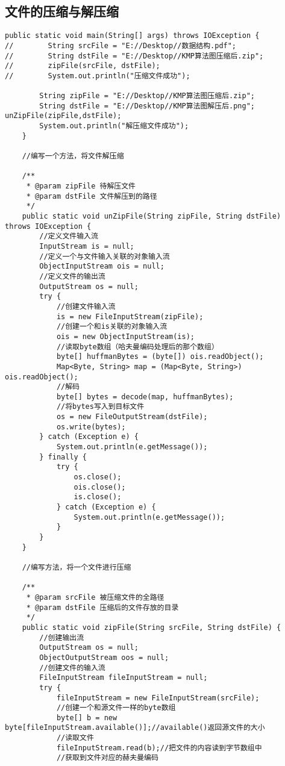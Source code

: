 \documentclass[a4paper]{report}
\begin{document}
\subsection{文件的压缩与解压缩}
\begin{lstlisting}
public static void main(String[] args) throws IOException {
//        String srcFile = "E://Desktop//数据结构.pdf";
//        String dstFile = "E://Desktop//KMP算法图压缩后.zip";
//        zipFile(srcFile, dstFile);
//        System.out.println("压缩文件成功");

        String zipFile = "E://Desktop//KMP算法图压缩后.zip";
        String dstFile = "E://Desktop//KMP算法图解压后.png";
unZipFile(zipFile,dstFile);
        System.out.println("解压缩文件成功");
    }

    //编写一个方法，将文件解压缩

    /**
     * @param zipFile 待解压文件
     * @param dstFile 文件解压到的路径
     */
    public static void unZipFile(String zipFile, String dstFile) throws IOException {
        //定义文件输入流
        InputStream is = null;
        //定义一个与文件输入关联的对象输入流
        ObjectInputStream ois = null;
        //定义文件的输出流
        OutputStream os = null;
        try {
            //创建文件输入流
            is = new FileInputStream(zipFile);
            //创建一个和is关联的对象输入流
            ois = new ObjectInputStream(is);
            //读取byte数组（哈夫曼编码处理后的那个数组）
            byte[] huffmanBytes = (byte[]) ois.readObject();
            Map<Byte, String> map = (Map<Byte, String>) ois.readObject();
            //解码
            byte[] bytes = decode(map, huffmanBytes);
            //将bytes写入到目标文件
            os = new FileOutputStream(dstFile);
            os.write(bytes);
        } catch (Exception e) {
            System.out.println(e.getMessage());
        } finally {
            try {
                os.close();
                ois.close();
                is.close();
            } catch (Exception e) {
                System.out.println(e.getMessage());
            }
        }
    }

    //编写方法，将一个文件进行压缩

    /**
     * @param srcFile 被压缩文件的全路径
     * @param dstFile 压缩后的文件存放的目录
     */
    public static void zipFile(String srcFile, String dstFile) {
        //创建输出流
        OutputStream os = null;
        ObjectOutputStream oos = null;
        //创建文件的输入流
        FileInputStream fileInputStream = null;
        try {
            fileInputStream = new FileInputStream(srcFile);
            //创建一个和源文件一样的byte数组
            byte[] b = new byte[fileInputStream.available()];//available()返回源文件的大小
            //读取文件
            fileInputStream.read(b);//把文件的内容读到字节数组中
            //获取到文件对应的赫夫曼编码


\end{lstlisting}
\end{document}

